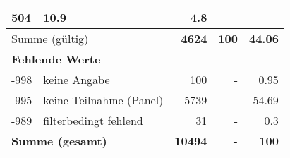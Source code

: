 \begin{longtable}{lXrrr}
       \num{504} &
       \num[round-mode=places,round-precision=2]{10,9} &
         \num[round-mode=places,round-precision=2]{4,8} \\
     \midrule
     \multicolumn{2}{l}{Summe (gültig)} &
       \textbf{\num{4624}} &
     \textbf{100} &
       \textbf{\num[round-mode=places,round-precision=2]{44,06}} \\
     \multicolumn{5}{l}{\textbf{Fehlende Werte}}\\
       -998 &
       keine Angabe &
         \num{100} &
        - &
         \num[round-mode=places,round-precision=2]{0,95} \\
       -995 &
       keine Teilnahme (Panel) &
         \num{5739} &
        - &
         \num[round-mode=places,round-precision=2]{54,69} \\
       -989 &
       filterbedingt fehlend &
         \num{31} &
        - &
         \num[round-mode=places,round-precision=2]{0,3} \\
     \midrule
     \multicolumn{2}{l}{\textbf{Summe (gesamt)}} &
          \textbf{\num{10494}} &
        \textbf{-} &
        \textbf{100} \\
     \bottomrule
     \end{longtable}
     
